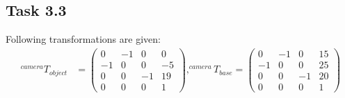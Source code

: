 \subsection*{Task 3.3}
Following transformations are given:
\begin{align*}
^{camera}T_{object} &= 
\begin{pmatrix}
0 & -1 & 0 & 0\\
-1 & 0 & 0 & -5\\
0 & 0 & -1 & 19\\
0 & 0 & 0 & 1
\end{pmatrix},
^{camera}T_{base} = 
\begin{pmatrix}
0 & -1 & 0 & 15\\
-1 & 0 & 0 & 25\\
0 & 0 & -1 & 20\\
0 & 0 & 0 & 1
\end{pmatrix}
\end{align*}
